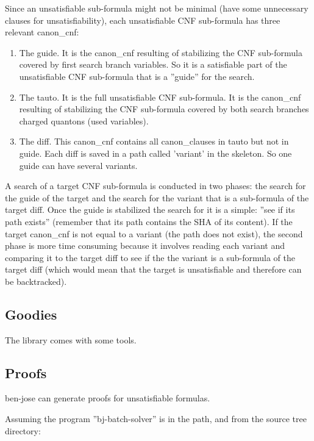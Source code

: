 \documentclass{easychair}
\newcommand{\quanton}{\textsf{quanton}}
\newcommand{\canoncnf}{\textsf{canon\_cnf}}
\newcommand{\canonclause}{\textsf{canon\_clause}}
\newcommand{\skeleton}{\textsf{skeleton}}
\begin{document}
Since an unsatisfiable sub-formula might not be minimal (have some unnecessary clauses for unsatisfiability), each unsatisfiable CNF sub-formula has three relevant {\canoncnf}: 

\begin{enumerate}
\item
The guide. It is the {\canoncnf} resulting of stabilizing the CNF sub-formula covered by first search branch variables. So it is a satisfiable part of the unsatisfiable CNF sub-formula that is a ''guide'' for the search.

\item
The tauto. It is the full unsatisfiable CNF sub-formula. It is the {\canoncnf} resulting of stabilizing the CNF sub-formula covered by both search branches charged {\quanton}s (used variables). 

\item
The diff. This {\canoncnf} contains all {\canonclause}s in tauto but not in guide. Each diff is saved in a path called 'variant' in the {\skeleton}. So one guide can have several variants. 
\end{enumerate}

A search of a target CNF sub-formula is conducted in two phases: the search for the guide of the target and the search for the variant that is a sub-formula of the target diff. Once the guide is stabilized the search for it is a simple: ''see if its path exists'' (remember that its path contains the SHA of its content). If the target {\canoncnf} is not equal to a variant (the path does not exist), the second phase is more time consuming because it involves reading each variant and comparing it to the target diff to see if the the variant is a sub-formula of the target diff (which would mean that the target is unsatisfiable and therefore can be backtracked).

\subsection{Goodies}

The library comes with some tools.

\subsection{Proofs}

ben-jose can generate proofs for unsatisfiable formulas. 

Assuming the program ''bj-batch-solver'' is in the path, and from the source tree directory:
\end{document}
